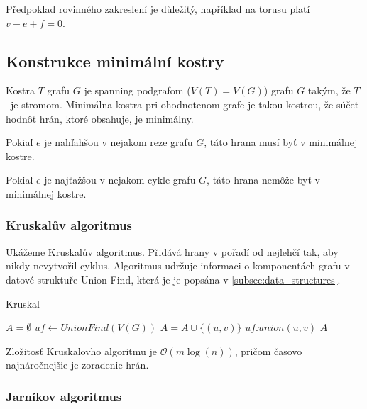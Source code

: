 \begin{note}
    Předpoklad rovinného zakreslení je důležitý,
    například na torusu platí $v - e + f = 0$.
\end{note}

\subsection{Konstrukce minimální kostry}

Kostra $T$ grafu $G$ je spanning podgrafom ($V(T)=V(G)$) grafu $G$ takým,
že $T$~je stromom. Minimálna kostra pri ohodnotenom grafe je takou kostrou,
že súčet hodnôt hrán, ktoré obsahuje, je minimálny.

\begin{theorem}
	Pokiaľ $e$ je nahľahšou v nejakom reze grafu $G$, táto hrana musí
	byť v minimálnej kostre.
\end{theorem}

\begin{theorem}
	Pokiaľ $e$ je najťažšou v nejakom cykle grafu $G$, táto hrana nemôže
	byť v minimálnej kostre.
\end{theorem}

\subsubsection{Kruskalův algoritmus}

Ukážeme Kruskalův algoritmus. Přidává hrany v pořadí od nejlehčí tak,
aby nikdy nevytvořil cyklus.
Algoritmus udržuje informaci o komponentách grafu v datové struktuře
Union Find, která je je popsána v
\autoref{subsec:data_structures}.

\begin{algorithm}
\caption{Kruskal}
\begin{algorithmic}[1]
    \State $A = \emptyset$
    \State $uf \gets UnionFind(V(G))$
            \State $A = A \cup \{(u,v)\}$
            \State $uf.union(u, v)$
        \EndIf
    \EndFor
    \State \Return $A$
\EndFunction
\end{algorithmic}
\end{algorithm}

Zložitosť Kruskalovho algoritmu je $\mathcal{O}(m \log(n))$, pričom
časovo najnáročnejšie je zoradenie hrán.

\subsubsection{Jarníkov algoritmus}


